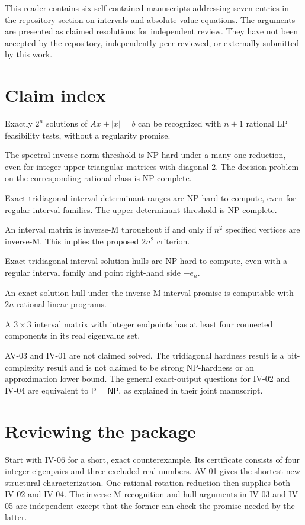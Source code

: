 

This reader contains six self-contained manuscripts addressing seven entries in the repository section on intervals and absolute value equations. The arguments are presented as claimed resolutions for independent review. They have not been accepted by the repository, independently peer reviewed, or externally submitted by this work.
\section*{Claim index}
\begin{description}[leftmargin=17mm,style=nextline]
\item[AV-01] Exactly $2^n$ solutions of $Ax+|x|=b$ can be recognized with $n+1$ rational LP feasibility tests, without a regularity promise.
\item[AV-02] The spectral inverse-norm threshold is NP-hard under a many-one reduction, even for integer upper-triangular matrices with diagonal 2. The decision problem on the corresponding rational class is NP-complete.
\item[IV-02] Exact tridiagonal interval determinant ranges are NP-hard to compute, even for regular interval families. The upper determinant threshold is NP-complete.
\item[IV-03] An interval matrix is inverse-M throughout if and only if $n^2$ specified vertices are inverse-M. This implies the proposed $2n^2$ criterion.
\item[IV-04] Exact tridiagonal interval solution hulls are NP-hard to compute, even with a regular interval family and point right-hand side $-e_n$.
\item[IV-05] An exact solution hull under the inverse-M interval promise is computable with $2n$ rational linear programs.
\item[IV-06] A $3\times3$ interval matrix with integer endpoints has at least four connected components in its real eigenvalue set.
\end{description}
AV-03 and IV-01 are not claimed solved. The tridiagonal hardness result is a bit-complexity result and is not claimed to be strong NP-hardness or an approximation lower bound. The general exact-output questions for IV-02 and IV-04 are equivalent to $\mathsf P=\mathsf{NP}$, as explained in their joint manuscript.
\section*{Reviewing the package}
Start with IV-06 for a short, exact counterexample. Its certificate consists of four integer eigenpairs and three excluded real numbers. AV-01 gives the shortest new structural characterization. One rational-rotation reduction then supplies both IV-02 and IV-04. The inverse-M recognition and hull arguments in IV-03 and IV-05 are independent except that the former can check the promise needed by the latter.

